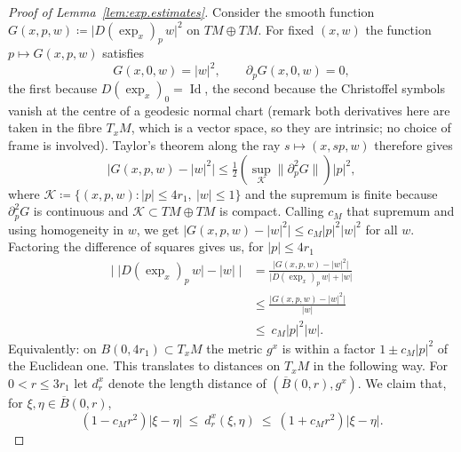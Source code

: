 \documentclass[11pt,reqno]{amsart}
\theoremstyle{plain}
\theoremstyle{definition}
\DeclareMathOperator{\Id}{Id}
\begin{document}
\begin{proof}[Proof of Lemma~\ref{lem:exp.estimates}]
    Consider the smooth function \(G(x,p,w)\coloneqq \big\lvert D(\exp_x)_p\,w\big\rvert^2\) on \(TM \oplus TM\).
    For fixed \( (x,w) \) the function \( p\mapsto G(x,p,w) \) satisfies
    \[
        G(x,0,w)=\lvert w\rvert^2,\qquad \partial_pG(x,0,w)=0 ,
    \]
    the first because \( D(\exp_x)_0=\Id \), the second because the Christoffel symbols vanish at the centre of a geodesic normal chart (remark both derivatives here are taken in the fibre \( T_xM \), which is a vector space, so they are intrinsic; no choice of frame is involved).  
    Taylor's theorem along the ray \( s\mapsto(x,sp,w) \) therefore gives
    \[
        \big\lvert G(x,p,w)-\lvert w\rvert^2\big\rvert
        \le\tfrac12\left(\sup_{\mathcal K}\big\lVert\partial^2_pG\big\rVert\right)\lvert p\rvert^2 ,
    \]
    where \(\mathcal K\coloneqq \{(x,p,w):\lvert p\rvert\le4r_1,\ \lvert w\rvert\le1\}\) and the supremum is finite because \( \partial^2_pG \) is continuous and \( \mathcal K\subset TM\oplus TM \) is compact.  
    Calling \( c_M \) that supremum and using homogeneity in \( w \), we get \( \big\lvert G(x,p,w)-\lvert w\rvert^2\big\rvert\le c_M\lvert p\rvert^2\lvert w\rvert^2 \) for all \( w \).
    Factoring the difference of squares gives us, for \(\lvert p\rvert\le4r_1\)
    \begin{equation}\label{eq:infinitesimal.comparison}
    \begin{split}
        \Big\lvert\;\big\lvert D(\exp_x)_p\,w\big\rvert-\lvert w\rvert\;\Big\rvert &= \frac{\big\lvert G(x,p,w)-\lvert w\rvert^2\big\rvert}{\big\lvert D(\exp_x)_p\,w\big\rvert+\lvert w\rvert}\\
        &\le \frac{\big\lvert G(x,p,w)-\lvert w\rvert^2\big\rvert}{\lvert w\rvert} \\ &\le\ c_M\lvert p\rvert^2\lvert w\rvert. 
    \end{split}
    \end{equation}
    Equivalently: on \( B(0,4r_1)\subset T_xM \) the metric \( g^x \) is within a factor \( 1\pm c_M\lvert p\rvert^2 \) of the Euclidean one. 
    This translates to distances on \(T_xM\) in the following way.
    For \( 0<r\le3r_1 \) let \( d^x_r \) denote the length distance of \( \left(\overline B(0,r),g^x\right) \).
    We claim that, for \( \xi,\eta\in\overline B(0,r) \),
    \begin{equation}\label{eq:ball.comparison}
        \left(1-c_Mr^2\right)\lvert\xi-\eta\rvert
        \ \le\ d^x_r(\xi,\eta)
        \ \le\ \left(1+c_Mr^2\right)\lvert\xi-\eta\rvert .
    \end{equation}

\end{proof}
\end{document}

